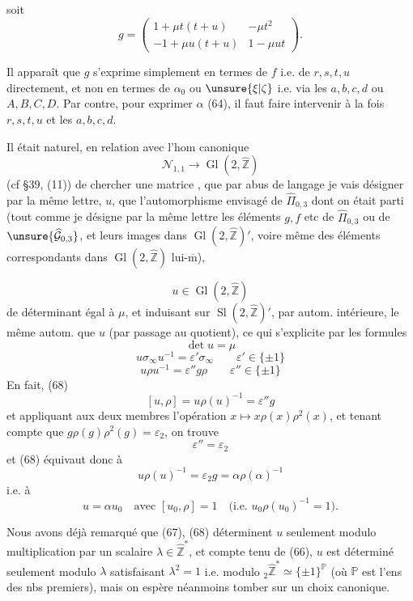 soit
\[
\tag{65}
g=\begin{pmatrix}1+\mu t(t+u)&-\mu t^2\\-1+\mu u(t+u)&1-\mu ut\end{pmatrix}.
\]

Il apparaît que $g$ s'exprime simplement en termes de $f$ i.e. de $r,s,t,u$ directement, et non en termes de $\alpha_0$ ou $\unsure{\xi|\zeta}$ i.e. via les $a,b,c,d$ ou $A,B,C,D$. Par contre, pour exprimer $\alpha$ (64), il faut faire intervenir à la fois  $r,s,t,u$ et les $a,b,c,d$.

Il était naturel, en relation avec l'hom canonique
\[
\mathcal N_{1,1}\longrightarrow\operatorname{Gl}(2,\widehat{\mathbb Z})
\]
(cf \S39, (11)) de chercher une matrice , que par abus de langage je vais désigner par la même lettre, $u$, que l'automorphisme envisagé de $\widehat\Pi_{0,3}$ dont on était parti (tout comme je désigne par la même lettre les éléments $g,f$ etc de $\widehat\Pi_{0,3}$ ou de $\unsure{\widehat{\mathcal G}_{0,3}}$, et leurs images dans $\operatorname{Gl}(2,\widehat{\mathbb Z})'$, voire même des éléments correspondants dans $\operatorname{Gl}(2,\widehat{\mathbb Z})$ lui-$\overline{\mathrm m}$),

\[
u\in\operatorname{Gl}(2,\widehat{\mathbb Z})
\]
 de déterminant égal à $\mu$, et induisant sur $\operatorname{Sl}(2,\widehat{\mathbb Z})'$, par autom. intérieure, le même autom. que $u$  (par passage au quotient), ce qui s'explicite par les formules
\[
\tag{66}\det u=\mu
\]
\[
\tag{67}u\sigma_\infty u^{-1}=\varepsilon'\sigma_\infty\qquad\varepsilon'\in\{\pm1\}
\]
\[
\tag{68}u\rho u^{-1}=\varepsilon''g\rho\qquad\varepsilon''\in\{\pm1\}
\]
En fait,  (68)  
\[
[u,\rho]=u\rho(u)^{-1}=\varepsilon''g
\]
et appliquant aux deux membres l'opération $x\mapsto x\rho(x)\rho^2(x)$, et tenant compte que $g\rho(g)\rho^2(g)=\varepsilon_2$,   on trouve
\[
\tag{68 bis}\varepsilon''=\varepsilon_2
\]
et (68) équivaut donc à
\[
u\rho(u)^{-1}=\varepsilon_2g=\alpha\rho(\alpha)^{-1}
\]
 i.e. à
\[
\tag{69}u=\alpha u_0\quad\text{avec }[u_0,\rho]=1
\quad\bigl(\text{i.e. }u_0\rho(u_0)^{-1}=1\bigr).
\]

Nous avons déjà remarqué que (67), (68) déterminent $u$ seulement modulo multiplication par un scalaire $\lambda\in\widehat{\mathbb Z}^*$, et compte tenu de (66), $u$ est déterminé seulement modulo $\lambda$ satisfaisant $\lambda^2=1$ i.e. modulo ${}_2\widehat{\mathbb Z}^*\simeq\{\pm1\}^{\mathbb P}$ (où $\mathbb P$ est l'ens des nbs premiers), mais on espère néanmoins tomber sur un choix canonique.

